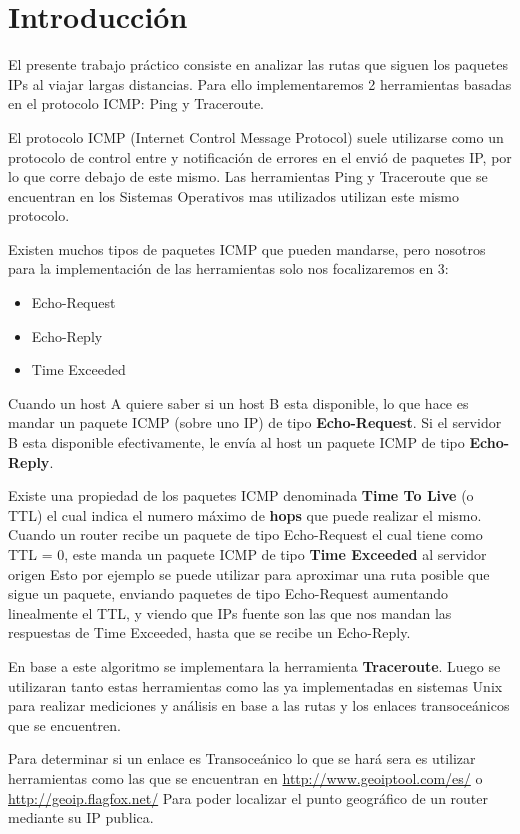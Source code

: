 \section{Introducci\'on}

El presente trabajo pr\'actico consiste en analizar las rutas que siguen los paquetes IPs al viajar largas distancias. Para ello implementaremos 2 herramientas basadas en el protocolo ICMP:
Ping y Traceroute.

El protocolo ICMP (Internet Control Message Protocol) suele utilizarse como un protocolo de control entre y notificaci\'on de errores en el envi\'o de paquetes IP, por lo que corre debajo de este mismo. Las herramientas Ping y Traceroute que se encuentran en los Sistemas Operativos mas utilizados utilizan este mismo protocolo.

Existen muchos tipos de paquetes ICMP que pueden mandarse, pero nosotros para la implementaci\'on de las herramientas solo nos focalizaremos en 3:

\begin{itemize}
 \item Echo-Request
 \item Echo-Reply
 \item Time Exceeded
\end{itemize}

Cuando un host A quiere saber si un host B esta disponible, lo que hace es mandar un paquete ICMP (sobre uno IP) de tipo {\bf Echo-Request}. Si el servidor B esta disponible efectivamente, le env\'ia al host un paquete ICMP de tipo {\bf Echo-Reply}.

Existe una propiedad de los paquetes ICMP denominada {\bf Time To Live} (o TTL) el cual indica el numero m\'aximo de {\bf hops} que puede realizar el mismo. Cuando un router recibe un paquete de tipo Echo-Request el cual tiene como TTL = 0, este manda un paquete ICMP de tipo {\bf Time Exceeded} al servidor origen Esto por ejemplo se puede utilizar para aproximar una ruta posible que sigue un paquete, enviando paquetes de tipo Echo-Request aumentando linealmente el TTL, y viendo que IPs fuente son las que nos mandan las respuestas de Time Exceeded, hasta que se recibe un Echo-Reply.

En base a este algoritmo se implementara la herramienta {\bf Traceroute}. Luego se utilizaran tanto estas herramientas como las ya implementadas en sistemas Unix para realizar mediciones y an\'alisis en base a las rutas y los enlaces transoce\'anicos que se encuentren.

Para determinar si un enlace es Transoce\'anico lo que se har\'a sera es utilizar herramientas como las que se encuentran en \url{http://www.geoiptool.com/es/} o \url{http://geoip.flagfox.net/} Para poder localizar el punto geogr\'afico de un router mediante su IP publica.

